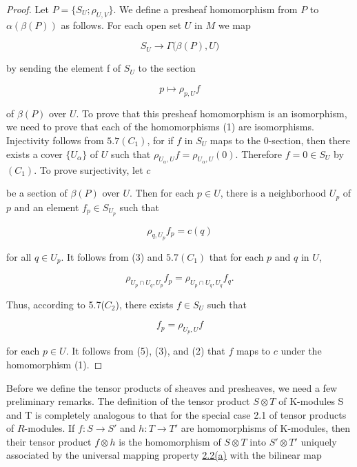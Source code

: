 \begin{proof}
Let $P=\{S_{U};\rho_{U,V}\}$. We define a presheaf homomorphism from $P$ to $\alpha(\beta(P))$ as follows. For each open set $U$ in $M$ we map

\begin{equation}
\tag{1}\label{eq:5.8:1}
S_{U}\to\Gamma\bigl(\beta(P),U\bigr)
\end{equation}

by sending the element f of  $ S_{U} $ to the section

\begin{equation}
\tag{2}\label{eq:5.8:2}
p\mapsto\rho_{p,U}f
\end{equation}

of $\beta(P)$ over $U$. To prove that this presheaf homomorphism is an isomorphism, we need to prove that each of the homomorphisms (1) are isomorphisms. Injectivity follows from $5.7(C_{1})$, for if $f$ in $S_{U}$ maps to the 0-section, then there exists a cover $\{U_{\alpha}\}$ of $U$ such that $\rho_{U_{\alpha},U}f=\rho_{U_{\alpha},U}(0)$. Therefore $f=0\in S_{U}$ by $(C_{1})$. To prove surjectivity, let $c$

be a section of $\beta(P)$ over $U$. Then for each $p \in U$, there is a neighborhood $U_p$ of $p$ and an element $f_p \in S_{U_p}$ such that

\begin{equation}
\tag{3}\label{eq:5.8:3}
\rho_{q,U_{p}}f_{p}=c(q)
\end{equation}

for all $q\in U_{p}$. It follows from (3) and $5.7(C_{1})$ that for each $p$ and $q$ in $U$,

\begin{equation}
\tag{4}\label{eq:5.8:4}
\rho_{U_{p}\cap U_{q},U_{p}}f_{p}=\rho_{U_{p}\cap U_{q},U_{q}}f_{q}.
\end{equation}

Thus, according to 5.7($C_{2}$), there exists $f \in S_{U}$ such that

\begin{equation}
\tag{5}\label{eq:5.8:5}
f_{p}=\rho_{U_{p},U}f
\end{equation}

for each $p \in U$. It follows from (5), (3), and (2) that $f$ maps to $c$ under the homomorphism (1).

\end{proof}

\label{thm:5.9} Before we define the tensor products of sheaves and presheaves, we need a few preliminary remarks. The definition of the tensor product  $ S \otimes T $ of K-modules S and T is completely analogous to that for the special case 2.1 of tensor products of $R$-modules. If  $ f: S \to S' $ and  $ h: T \to T' $ are homomorphisms of K-modules, then their tensor product  $ f \otimes h $ is the homomorphism of  $ S \otimes T $ into  $ S' \otimes T' $ uniquely associated by the universal mapping property \hyperref[thm:2.2]{2.2(a)} with the bilinear map

